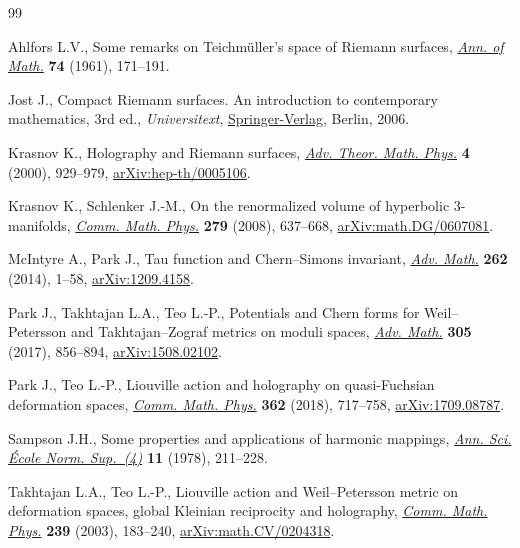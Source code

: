 \documentclass[pdftex]{sigma}%
\numberwithin{equation}{section}
\begin{document}
\begin{thebibliography}{99}
\footnotesize\itemsep=0pt

Ahlfors L.V., Some remarks on {T}eichm\"uller's space of {R}iemann surfaces,
 \href{https://doi.org/10.2307/1970309}{\textit{Ann. of Math.}} \textbf{74} (1961), 171--191.

Jost J., Compact {R}iemann surfaces. An introduction to contemporary
 mathematics, 3rd ed., \textit{Universitext}, \href{https://doi.org/10.1007/978-3-540-33067-7}{Springer-Verlag}, Berlin, 2006.

Krasnov K., Holography and {R}iemann surfaces, \href{https://doi.org/10.4310/ATMP.2000.v4.n4.a5}{\textit{Adv. Theor. Math. Phys.}}
 \textbf{4} (2000), 929--979, \href{https://arxiv.org/abs/hep-th/0005106}{arXiv:hep-th/0005106}.

Krasnov K., Schlenker J.-M., On the renormalized volume of hyperbolic
 3-manifolds, \href{https://doi.org/10.1007/s00220-008-0423-7}{\textit{Comm. Math. Phys.}} \textbf{279} (2008), 637--668,
 \href{https://arxiv.org/abs/math.DG/0607081}{arXiv:math.DG/0607081}.

McIntyre A., Park J., Tau function and {C}hern--{S}imons invariant,
 \href{https://doi.org/10.1016/j.aim.2014.05.005}{\textit{Adv. Math.}} \textbf{262} (2014), 1--58, \href{https://arxiv.org/abs/1209.4158}{arXiv:1209.4158}.

Park J., Takhtajan L.A., Teo L.-P., Potentials and {C}hern forms for
 {W}eil--{P}etersson and {T}akhtajan--{Z}ograf metrics on moduli spaces,
 \href{https://doi.org/10.1016/j.aim.2016.10.002}{\textit{Adv. Math.}} \textbf{305} (2017), 856--894, \href{https://arxiv.org/abs/1508.02102}{arXiv:1508.02102}.

Park J., Teo L.-P., Liouville action and holography on quasi-{F}uchsian
 deformation spaces, \href{https://doi.org/10.1007/s00220-018-3164-2}{\textit{Comm. Math. Phys.}} \textbf{362} (2018), 717--758,
 \href{https://arxiv.org/abs/1709.08787}{arXiv:1709.08787}.

Sampson J.H., Some properties and applications of harmonic mappings,
 \href{https://doi.org/10.24033/asens.1344}{\textit{Ann. Sci. \'Ecole Norm. Sup.~(4)}} \textbf{11} (1978), 211--228.

Takhtajan L.A., Teo L.-P., Liouville action and {W}eil--{P}etersson metric on
 deformation spaces, global {K}leinian reciprocity and holography,
 \href{https://doi.org/10.1007/s00220-003-0878-5}{\textit{Comm. Math. Phys.}} \textbf{239} (2003), 183--240,
 \href{https://arxiv.org/abs/math.CV/0204318}{arXiv:math.CV/0204318}.


\end{thebibliography}
\end{document}
